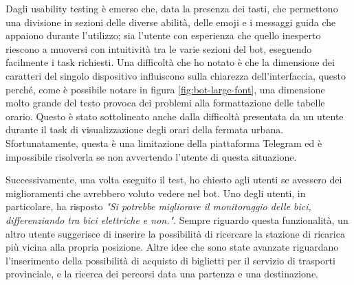 Dagli usability testing è emerso che, data la presenza dei tasti, che permettono una divisione in sezioni delle diverse abilità, delle emoji e i messaggi guida che appaiono durante l'utilizzo; sia l'utente con esperienza che quello inesperto riescono a muoversi con intuitività tra le varie sezioni del bot, eseguendo facilmente i task richiesti. 
Una difficoltà che ho notato è che la dimensione dei caratteri del singolo dispositivo influiscono sulla chiarezza dell'interfaccia, questo perché, come è possibile notare in figura \ref{fig:bot-large-font}, una dimensione molto grande del testo provoca dei problemi alla formattazione delle tabelle orario. Questo è stato sottolineato anche dalla difficoltà  presentata da un utente durante il task di visualizzazione degli orari della fermata urbana. Sfortunatamente, questa è una limitazione della piattaforma Telegram ed è impossibile risolverla se non avvertendo l'utente di questa situazione. 

Successivamente, una volta eseguito il test, ho chiesto agli utenti se avessero dei miglioramenti che avrebbero voluto vedere nel bot. Uno degli utenti, in particolare, ha risposto 
\textit{"Si potrebbe migliorare il monitoraggio delle bici, differenziando tra bici elettriche e non."}. Sempre riguardo questa funzionalità, un altro utente suggerisce di inserire la possibilità di ricercare la stazione di ricarica più vicina alla propria posizione. 
Altre idee che sono state avanzate riguardano l'inserimento della possibilità di acquisto di biglietti per il servizio di trasporti provinciale, e la ricerca dei percorsi data una partenza e una destinazione.


